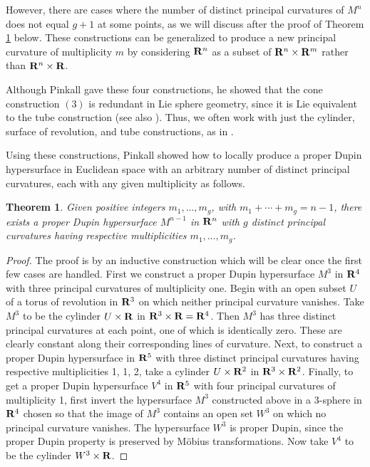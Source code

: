\documentclass[12pt]{article}
\newtheorem{theorem}{Theorem}[section]
\begin{document}
{However, there are cases where the number
of distinct principal curvatures of $M^n$ does not equal $g+1$ at some points, as we will discuss after the proof of
Theorem \ref{thm:4.1.1} below.   These constructions can be
generalized to produce a new principal curvature of multiplicity
$m$ by considering ${\bf R}^n$ as a subset of 
${\bf R}^n \times {\bf R}^m$ rather than ${\bf R}^n \times {\bf R}$.


Although Pinkall gave these four constructions, he showed \cite[p. 438]{P2} 
that the cone construction $(3)$ is redundant in Lie sphere geometry, since it
is Lie equivalent
to the tube construction (see also \cite[p. 144]{Cec9}). Thus, we often work with just the cylinder, 
surface of revolution, and tube constructions, as in \cite{Cec9}.


Using these constructions, Pinkall \cite{P2} showed how
to locally produce a proper Dupin hypersurface in Euclidean space with an
arbitrary number of distinct principal curvatures, each with any given multiplicity as follows.

\begin{theorem}
\label{thm:4.1.1}
Given positive integers $m_1, \ldots , m_g$, with 
$m_1 + \cdots + m_g = n-1$, there exists a proper
Dupin hypersurface $M^{n-1}$ in ${\bf R}^n$ with $g$
distinct principal curvatures having respective
multiplicities $m_1, \ldots , m_g$.
\end{theorem} 
\begin{proof}
The proof is by an inductive construction
which will be clear once the first few cases are handled.
First we construct a proper Dupin hypersurface $M^3$ in 
${\bf R}^4$ with three principal curvatures of multiplicity
one. Begin with an open subset $U$ of a torus of
revolution in ${\bf R}^3$ on which neither principal
curvature vanishes.  Take $M^3$ to be the cylinder
$U \times {\bf R}$ in ${\bf R}^3 \times {\bf R} =
{\bf R}^4$.  Then $M^3$ has three distinct principal
curvatures at each point, one of which is identically
zero.  These are clearly constant along their
corresponding lines of curvature.
Next, to construct a proper Dupin hypersurface in ${\bf R}^5$
with three distinct principal curvatures having
respective multiplicities 1, 1, 2, take a cylinder
$U \times {\bf R}^2$ in ${\bf R}^3 \times {\bf R}^2$. Finally,
to get a proper Dupin hypersurface $V^4$ in
${\bf R}^5$ with four principal curvatures of multiplicity 1, first 
invert the hypersurface $M^3$ constructed above in a 3-sphere
in ${\bf R}^4$ chosen so that the image of $M^3$
contains an open set $W^3$ on which no principal
curvature vanishes.  The hypersurface $W^3$ is proper Dupin, since the proper Dupin property is preserved by
M\"{o}bius transformations.
Now take $V^4$ to be the
cylinder $W^3 \times {\bf R}$. 
\end{proof}



}
\end{document}

